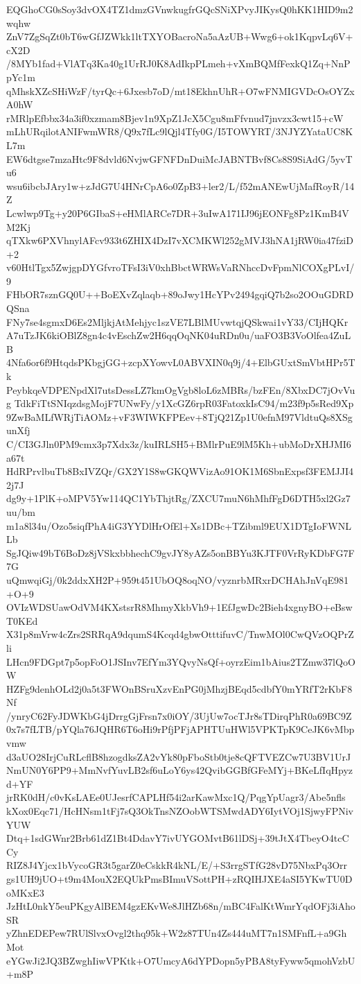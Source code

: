 EQGhoCG0sSoy3dvOX4TZ1dmzGVnwkugfrGQcSNiXPvyJIKysQ0hKK1HID9m2wqhw
ZnV7ZgSqZt0bT6wGfJZWkk1ltTXYOBacroNa5aAzUB+Wwg6+ok1KqpvLq6V+cX2D
/8MYb1fad+VlATq3Ka40g1UrRJ0K8AdIkpPLmeh+vXmBQMfFexkQ1Zq+NnPpYc1m
qMhskXZcSHiWzF/tyrQc+6Jxesb7oD/mt18EkhnUhR+O7wFNMIGVDcOsOYZxA0hW
rMRlpEfbbx34a3if0xzmam8Bjev1n9XpZ1JcX5Cgu8mFfvnud7jnvzx3cwt15+cW
mLhURqilotANIFwmWR8/Q9x7fLc9lQjl4Tfy0G/I5TOWYRT/3NJYZYataUC8KL7m
EW6dtgse7mzaHtc9F8dvld6NvjwGFNFDnDuiMcJABNTBvf8Cs8S9SiAdG/5yvTu6
wsu6ibcbJAry1w+zJdG7U4HNrCpA6o0ZpB3+ler2/L/f52mANEwUjMafRoyR/14Z
Lcwlwp9Tg+y20P6GIbaS+eHMlARCe7DR+3uIwA171IJ96jEONFg8Pz1KmB4VM2Kj
qTXkw6PXVhnylAFcv933t6ZHIX4DzI7vXCMKWl252gMVJ3hNA1jRW0ia47fziD+2
v60HtlTgx5ZwjgpDYGfvroTFsI3iV0xhBbctWRWsVaRNhccDvFpmNlCOXgPLvI/9
FHbOR7sznGQ0U++BoEXvZqlaqb+89oJwy1HcYPv2494gqiQ7b2so2OOuGDRDQSna
FNy7se4sgmxD6Es2MljkjAtMehjyc1szVE7LBlMUvwtqjQSkwai1vY33/CIjHQKr
A7uTzJK6kiOBlZ8gn4c4vEschZw2H6qqOqNK04uRDn0u/uaFO3B3VoOlfea4ZuLB
4Nfa6or6f9HtqdsPKbgjGG+zcpXYowvL0ABVXIN0q9j/4+ElbGUxtSmVbtHPr5Tk
PeybkqeVDPENpdXl7utsDessLZ7kmOgVgb8loL6zMBRs/bzFEn/8XbxDC7jOvVug
TdkFiTtSNIqzdsgMojF7UNwFy/y1XcGZ6rpR03FatoxkIsC94/m23f9p5sRed9Xp
9ZwBaMLfWRjTiAOMz+vF3WIWKFPEev+8TjQ21Zp1U0efnM97VldtuQs8XSgunXfj
C/CI3GJln0PM9cmx3p7Xdx3z/kuIRLSH5+BMlrPuE9lM5Kh+ubMoDrXHJMI6a67t
HdRPrvlbuTb8BxIVZQr/GX2Y1S8wGKQWVizAo91OK1M6SbnExpsf3FEMJJI42j7J
dg9y+1PlK+oMPV5Yw114QC1YbThjtRg/ZXCU7muN6hMhfFgD6DTH5xl2Gz7uu/bm
m1a8l34u/Ozo5siqfPhA4iG3YYDlHrOfEl+Xs1DBc+TZibml9EUX1DTgIoFWNLLb
SgJQiw49bT6BoDz8jVSkxbbhechC9gvJY8yAZs5onBBYu3KJTF0VrRyKDbFG7F7G
uQmwqiGj/0k2ddxXH2P+959t451UbOQ8oqNO/vyznrbMRxrDCHAhJnVqE981+O+9
OVIzWDSUawOdVM4KXstsrR8MhmyXkbVh9+1EfJgwDc2Bieh4xgnyBO+eBswT0KEd
X31p8mVrw4cZrs2SRRqA9dqumS4Kcqd4gbwOtttifuvC/TnwMOl0CwQVzOQPrZli
LHcn9FDGpt7p5opFoO1JSInv7EfYm3YQvyNsQf+oyrzEim1bAius2TZmw37lQoOW
HZFg9denhOLd2j0a5t3FWOnBSruXzvEnPG0jMhzjBEqd5cdbfY0mYRfT2rKbF8Nf
/ynryC62FyJDWKbG4jDrrgGjFrsn7x0iOY/3UjUw7ocTJr8sTDirqPhR0a69BC9Z
0x7s7fLTB/pYQla76JQHR6T6oHi9rPfjPFjAPHTUuHWl5VPKTpK9CeJK6vMbpvmw
d3aUO28IrjCuRLcflB8hzogdksZA2vYk80pFboStb0tje8cQFTVEZCw7U3BV1UrJ
NmUN0Y6PP9+MmNvfYuvLB2sf6uLoY6ys42QvibGGBfGFeMYj+BKeLfIqHpyzd+YF
jrRK0dH/c0vKsLAEe0UJesrfCAPLHf54i2arKawMxc1Q/PqgYpUagr3/Abe5nfls
kXox0Eqc71/HcHNsm1tFj7sQ3OkTnsNZOobWTSMwdADY6IytVOj1SjwyFPNivYUW
Dtq+1sdGWnr2Brb61dZ1Bt4DdavY7ivUYGOMvtB61lDSj+39tJtX4TbeyO4tcCCy
RIZ8J4Yjcx1bVycoGR3t5garZ0eCskkR4kNL/E/+S3rrgSTfG28vD75NbxPq3Orr
gs1UH9jUO+t9m4MouX2EQUkPmsBImuVSottPH+zRQIHJXE4aSI5YKwTU0DoMKxE3
JzHtL0nkY5euPKgyAlBEM4gzEKvWe8JlHZb68n/mBC4FalKtWmrYqdOFj3iAhoSR
yZhnEDEPew7RUlSlvxOvgl2thq95k+W2z87TUn4Zs444uMT7n1SMFnfL+a9GhMot
eYGwJi2JQ3BZwghIiwVPKtk+O7UmcyA6dYPDopn5yPBA8tyFyww5qmohVzbU+m8P
